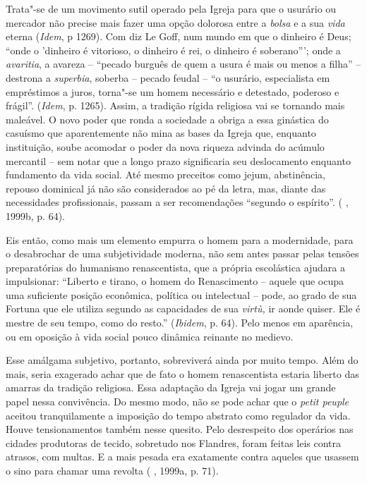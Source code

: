 Trata"-se de um movimento sutil operado pela Igreja para que o usurário
ou mercador não precise mais fazer uma opção dolorosa entre a
\emph{bolsa} e a sua \emph{vida} eterna (\emph{Idem}, p 1269). Com diz
Le Goff, num mundo em que o dinheiro é Deus; ``onde o 'dinheiro é
vitorioso, o dinheiro é rei, o dinheiro é soberano'''; onde a
\emph{avaritia}, a avareza -- ``pecado burguês de quem a usura é mais ou
menos a filha'' -- destrona a \emph{superbia}, soberba -- pecado feudal
-- ``o usurário, especialista em empréstimos a juros, torna"-se um homem
necessário e detestado, poderoso e frágil''. (\emph{Idem}, p. 1265).
Assim, a tradição rígida religiosa vai se tornando mais maleável. O novo
poder que ronda a sociedade a obriga a essa ginástica do casuísmo que
aparentemente não mina as bases da Igreja que, enquanto instituição,
soube acomodar o poder da nova riqueza advinda do acúmulo mercantil --
sem notar que a longo prazo significaria seu deslocamento enquanto
fundamento da vida social. Até mesmo preceitos como jejum, abstinência,
repouso dominical já não são considerados ao pé da letra, mas, diante
das necessidades profissionais, passam a ser recomendações ``segundo o
espírito''. ( , 1999b, p. 64).

Eis então, como mais um elemento empurra o homem para a modernidade,
para o desabrochar de uma subjetividade moderna, não sem antes passar
pelas tensões preparatórias do humanismo renascentista, que a própria
escolástica ajudara a impulsionar: ``Liberto e tirano, o homem do
Renascimento -- aquele que ocupa uma suficiente posição econômica,
política ou intelectual -- pode, ao grado de sua Fortuna que ele utiliza
segundo as capacidades de sua \emph{virtù,} ir aonde quiser. Ele é
mestre de seu tempo, como do resto.'' (\emph{Ibidem}, p. 64). Pelo menos
em aparência, ou em oposição à vida social pouco dinâmica reinante no
medievo.

Esse amálgama subjetivo, portanto, sobreviverá ainda por muito tempo.
Além do mais, seria exagerado achar que de fato o homem renascentista
estaria liberto das amarras da tradição religiosa. Essa adaptação da
Igreja vai jogar um grande papel nessa convivência. Do mesmo modo, não
se pode achar que o \emph{petit peuple} aceitou tranquilamente a
imposição do tempo abstrato como regulador da vida. Houve tensionamentos
também nesse quesito. Pelo desrespeito dos operários nas cidades
produtoras de tecido, sobretudo nos Flandres, foram feitas leis contra
atrasos, com multas. E a mais pesada era exatamente contra aqueles que
usassem o sino para chamar uma revolta ( , 1999a, p. 71).

